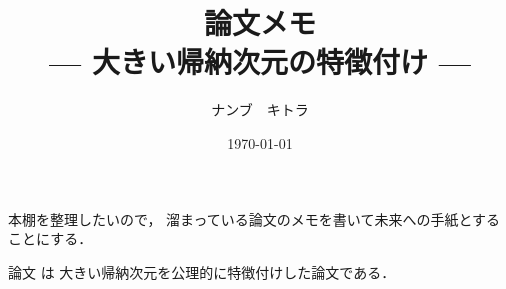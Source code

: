 \documentclass[leqno, a4paper, 12pt]{jsarticle}
\title{論文メモ
\large{\\--- 大きい帰納次元の特徴付け ---}
}
\author{ナンブ　キトラ}
\date{\today}
\begin{document}
\maketitle

本棚を整理したいので，
溜まっている論文のメモを書いて未来への手紙とすることにする．


論文
\cite{MR0238282}
は
大きい帰納次元を公理的に特徴付けした論文である．
\nocite{*}


\end{document}
